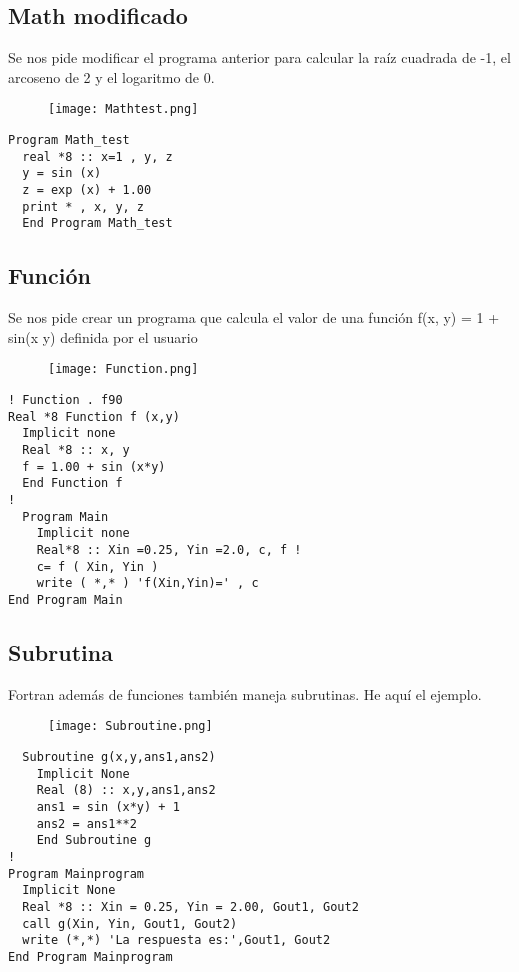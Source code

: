 \documentclass[12pt]{article}
\begin{document}
\subsection{Math modificado}

Se nos pide modificar el programa anterior para calcular la raíz cuadrada de -1, el arcoseno de 2 y el logaritmo de 0.

\begin{figure}[h]

\centering

\texttt{[image: Mathtest.png]}

\end{figure}

\begin{verbatim}
Program Math_test
  real *8 :: x=1 , y, z
  y = sin (x)
  z = exp (x) + 1.00
  print * , x, y, z
  End Program Math_test
\end{verbatim}

\subsection{Función}

Se nos pide crear un programa que calcula el valor de una función f(x, y) = 1 + sin(x y) definida por el usuario

\begin{figure}[h]

\centering

\texttt{[image: Function.png]}

\end{figure}

\begin{verbatim}
! Function . f90
Real *8 Function f (x,y)
  Implicit none
  Real *8 :: x, y
  f = 1.00 + sin (x*y)
  End Function f
!
  Program Main
    Implicit none
    Real*8 :: Xin =0.25, Yin =2.0, c, f !
    c= f ( Xin, Yin )
    write ( *,* ) 'f(Xin,Yin)=' , c
End Program Main
\end{verbatim}

\subsection{Subrutina}

Fortran además de funciones también maneja subrutinas. He aquí el ejemplo.

\begin{figure}[h]

\centering

\texttt{[image: Subroutine.png]}

\end{figure}

\begin{verbatim}
  Subroutine g(x,y,ans1,ans2)
    Implicit None
    Real (8) :: x,y,ans1,ans2
    ans1 = sin (x*y) + 1
    ans2 = ans1**2
    End Subroutine g
!
Program Mainprogram
  Implicit None
  Real *8 :: Xin = 0.25, Yin = 2.00, Gout1, Gout2
  call g(Xin, Yin, Gout1, Gout2)
  write (*,*) 'La respuesta es:',Gout1, Gout2
End Program Mainprogram
\end{verbatim}
\end{document}
